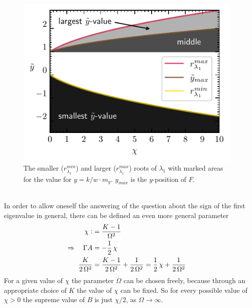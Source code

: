 \documentclass{article}
\begin{document}
\begin{figure}
    \includegraphics{pictures/sign_of_ev1.pdf}
    \vspace*{-2cm}\caption{The smaller ($r_{\lambda_1}^{min}$) and larger ($r_{\lambda_1}^{max}$) roots of $\lambda_1$ with marked areas for the value for ${y}=k/w\cdot m_y$. ${y}_{max}$ is the ${y}$-position of $F$.}
    \label{fig:sign_lam1}
\end{figure}\\
In order to allow oneself the answering of the question about the sign of the first eigenvalue in general, there can be defined an even more general parameter
\begin{align*}
    \chi\vcentcolon&=\frac{K-1}{\Omega^2}\\
    \Rightarrow\quad\Gamma A&=-\frac{1}{2}\,\chi\\
    \frac{K}{2\,\Omega^2}&=\frac{K-1}{2\,\Omega^2}+\frac{1}{2\,\Omega^2}=\frac{1}{2}\,\chi+\frac{1}{2\,\Omega^2}
\end{align*}
For a given value of $\chi$ the parameter $\Omega$ can be chosen freely, because through an appropriate choice of $K$ the value of $\chi$ can be fixed. So for every possible value of $\chi>0$ the supreme value of $B$ is just $\chi/2$, as $\Omega\rightarrow\infty$.
\end{document}

